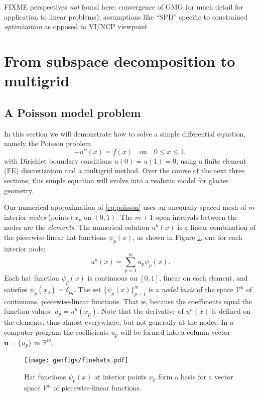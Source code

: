 \documentclass[letterpaper,final,12pt,reqno]{amsart}
\newcommand{\RR}{\mathbb{R}}
\newcommand{\bu}{\mathbf{u}}
\numberwithin{equation}{section}
\numberwithin{figure}{section}
\numberwithin{table}{section}
\begin{document}
FIXME perspectives \emph{not} found here: convergence of GMG (or much detail for application to linear problems); assumptions like ``SPD'' specific to constrained \emph{optimization} as opposed to VI/NCP viewpoint


\section{From subspace decomposition to multigrid} \label{sec:subspace}

\subsection*{A Poisson model problem}  In this section we will demonstrate how to solve a simple differential equation, namely the Poisson problem
\begin{equation}
- u''(x) = f(x) \quad \text{on} \quad 0 \le x \le 1, \label{eq:poisson}
\end{equation}
with Dirichlet boundary conditions $u(0)=u(1)=0$, using a finite element (FE) discretization and a multigrid method.  Over the course of the next three sections, this simple equation will evolve into a realistic model for glacier geometry.

Our numerical approximation of \eqref{eq:poisson} uses an unequally-spaced mesh of $m$ interior \emph{nodes} (points) $x_p$ on $(0,1)$.  The $m+1$ open intervals between the nodes are the \emph{elements}.  The numerical solution $u^h(x)$ is a linear combination of the piecewise-linear hat functions $\psi_p(x)$, as shown in Figure \ref{fig:finehats}, one for each interior node:
\begin{equation}
u^h(x) = \sum_{p=1}^m u_p \psi_p(x). \label{eq:trialsolution}
\end{equation}
Each hat function $\psi_p(x)$ is continuous on $[0,1]$, linear on each element, and satisfies $\psi_p(x_q) = \delta_{pq}$.  The set $\{\psi_p(x)\}_{p=1}^m$ is a \emph{nodal basis} of the space $\mathcal{V}^h$ of continuous, piecewise-linear functions.  That is, because the coefficients equal the function values: $u_p=u^h(x_p)$.  Note that the derivative of $u^h(x)$ is defined on the elements, thus almost everywhere, but not generally at the nodes.  In a computer program the coefficients $u_p$ will be formed into a column vector $\bu=\{u_p\}$ in $\RR^m$.

\begin{figure}
\texttt{[image: genfigs/finehats.pdf]}
\caption{Hat functions $\psi_p(x)$ at interior points $x_p$ form a basis for a vector space $\mathcal{V}^h$ of piecewise-linear functions.}
\label{fig:finehats}
\end{figure}
\end{document}
